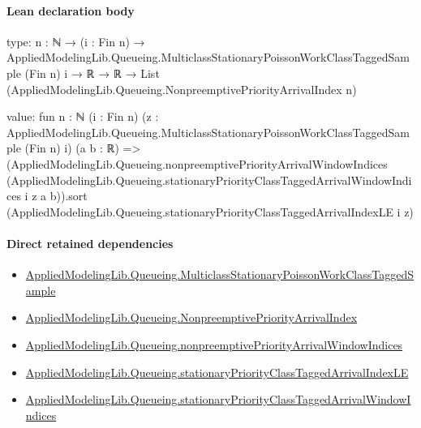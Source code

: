 \documentclass[10pt]{article}
\begin{document}
\paragraph{Lean declaration body}
\begin{ReviewVerbatim}
type:
{n : ℕ} →
  (i : Fin n) →
    AppliedModelingLib.Queueing.MulticlassStationaryPoissonWorkClassTaggedSample (Fin n) i →
      ℝ → ℝ → List (AppliedModelingLib.Queueing.NonpreemptivePriorityArrivalIndex n)

value:
fun {n : ℕ} (i : Fin n) (z : AppliedModelingLib.Queueing.MulticlassStationaryPoissonWorkClassTaggedSample (Fin n) i)
    (a b : ℝ) =>
  (AppliedModelingLib.Queueing.nonpreemptivePriorityArrivalWindowIndices
        (AppliedModelingLib.Queueing.stationaryPriorityClassTaggedArrivalWindowIndices i z a b)).sort
    (AppliedModelingLib.Queueing.stationaryPriorityClassTaggedArrivalIndexLE i z)
\end{ReviewVerbatim}

\paragraph{Direct retained dependencies}
\begin{itemize}\raggedright
\item \hyperlink{library-prerequisite-755cdb28ceaf46d2}{Applied\allowbreak{}Modeling\allowbreak{}Lib.\allowbreak{}Queueing.\allowbreak{}Multiclass\allowbreak{}Stationary\allowbreak{}Poisson\allowbreak{}Work\allowbreak{}Class\allowbreak{}Tagged\allowbreak{}Sample}
\item \hyperlink{governing-declaration-5d3724f4dc832d77}{Applied\allowbreak{}Modeling\allowbreak{}Lib.\allowbreak{}Queueing.\allowbreak{}Nonpreemptive\allowbreak{}Priority\allowbreak{}Arrival\allowbreak{}Index}
\item \hyperlink{governing-declaration-2ae4329b7cd91c5b}{Applied\allowbreak{}Modeling\allowbreak{}Lib.\allowbreak{}Queueing.\allowbreak{}nonpreemptive\allowbreak{}Priority\allowbreak{}Arrival\allowbreak{}Window\allowbreak{}Indices}
\item \hyperlink{governing-declaration-6eb7b19311e0b293}{Applied\allowbreak{}Modeling\allowbreak{}Lib.\allowbreak{}Queueing.\allowbreak{}stationary\allowbreak{}Priority\allowbreak{}Class\allowbreak{}Tagged\allowbreak{}Arrival\allowbreak{}Index\allowbreak{}LE}
\item \hyperlink{governing-declaration-9f498af160c98bd8}{Applied\allowbreak{}Modeling\allowbreak{}Lib.\allowbreak{}Queueing.\allowbreak{}stationary\allowbreak{}Priority\allowbreak{}Class\allowbreak{}Tagged\allowbreak{}Arrival\allowbreak{}Window\allowbreak{}Indices}
\end{itemize}
\hypertarget{governing-declaration-c8dff705756357c1}{}
\end{document}
